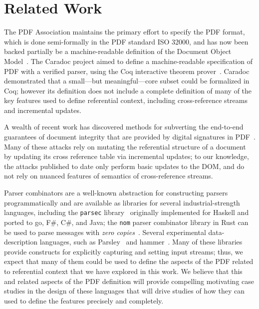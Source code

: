 \section{Related Work}
\label{sec:rel-work}


The PDF Association maintains the primary effort to specify the PDF
format, which is done semi-formally in the PDF standard ISO 32000, and has now
been backed partially be a machine-readable definition of the Document
Object Model~\cite{wyatt2021work}.
%
The Caradoc project aimed to define a machine-readable specification
of PDF with a verified parser, using the Coq interactive theorem
prover~\cite{g.endignouxCaradocPragmaticApproach2016}.
%
Caradoc demonstrated that a small---but meaningful---core subset could
be formalized in Coq;
%
however its definition does not include a complete definition of many
of the key features used to define referential context, including
cross-reference streams and incremental updates.

A wealth of recent work has discovered methods for subverting the
end-to-end guarantees of document integrity that are provided by
digital signatures in
PDF~\cite{mullerPracticalDecryptionExFiltration2019,mladenovTrillionDollarRefund2019,mullerProcessingDangerousPaths2021,ndsssymposiumNDSS2021Shadow2021,rohlmannBreakingSpecificationPDF2021}.
%
Many of these attacks rely on mutating the referential structure of a
document by updating its cross reference table via incremental
updates;
%
to our knowledge, the attacks published to date only perform basic
updates to the DOM, and do not rely on nuanced features of semantics
of cross-reference streams.

Parser combinators are a well-known abstraction for constructing
parsers programmatically and are available as libraries for several
industrial-strength languages, including the \texttt{parsec}
library~\cite{leijen2001parsec} originally implemented for Haskell and
ported to go, F\#, C\#, and Java;
%
the \texttt{nom} parser combinator library in Rust can be used to
parse messages with \emph{zero copies}~\cite{couprie2015nom}.
%
Several experimental data-description languages, such as
Parsley~\cite{mundkurResearchReportParsley2020} and
hammer~\cite{bratus2017curing}.
%
Many of these libraries provide constructs for explicitly capturing
and setting input streams;
%
thus, we expect that many of them could be used to define the aspects
of the PDF related to referential context that we have explored in
this work.
%
We believe that this and related aspects of the PDF definition will
provide compelling motivating case studies in the design of these
languages that will drive studies of how they can used to define the
features precisely and completely.
